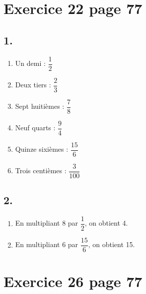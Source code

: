 \documentclass[12pt,a4paper]{article}
\begin{document}
\section*{Exercice 22 page 77}

	\subsection*{1. }
		\begin{multicols}{2}
				
			\begin{enumerate}
				\item Un demi : $\dfrac{1}{2}$
				\item Deux tiers : $\dfrac{2}{3}$
				\item Sept huitièmes : $\dfrac{7}{8}$
				\item Neuf quarts : $\dfrac{9}{4}$
				\item Quinze sixièmes : $\dfrac{15}{6}$
				\item Trois centièmes : $\dfrac{3}{100}$
			\end{enumerate}
		\end{multicols}
	
	\subsection*{2. }
	
		\begin{enumerate}
			
		 
			
			\item En multipliant 8 par $\dfrac{1}{2}$, on obtient 4.
			\item En multipliant 6 par $\dfrac{15}{6}$, on obtient 15.
		\end{enumerate}
	
	
\section*{Exercice 26 page 77}
\end{document}
